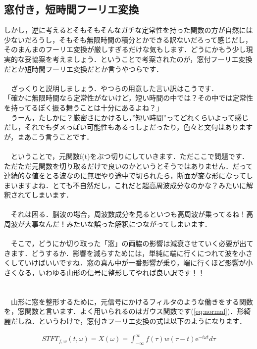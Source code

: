 \documentclass[11pt,a4paper,uplatex]{ujreport} 	%
\begin{document}
\subsection{窓付き，短時間フーリエ変換}
しかし，逆に考えるとそもそもそんなガチな定常性を持った関数の方が自然には少ないだろうし，そもそも無限時間の積分とかできる訳ないだろって感じだし，そのまんまのフーリエ変換が厳しすぎるだけな気もします．どうにかもう少し現実的な妥協案を考えましょう．ということで考案されたのが，窓付フーリエ変換だとか短時間フーリエ変換だとか言うやつらです．\\
\\
　ざっくりと説明しましょう．やつらの用意した言い訳はこうです．\\
「確かに無限時間なら定常性がないけど，短い時間の中では？その中では定常性を持ってるぽく振る舞うことは十分にあるよね？」\\
　うーん，たしかに？厳密さにかけるし，”短い時間”ってどれくらいよって感じだし，それでもダメっぽい可能性もあるっしょだったり，色々と文句はありますが，まあこう言うことです．\\
\\
　ということで，元関数f(t)をぶつ切りにしていきます．ただここで問題です．ただただ元関数を切り取るだけで良いのかというとそうではありません．だって連続的な値をとる波なのに無理やり途中で切られたら，断面が変な形になってしまいますよね．とても不自然だし，これだと超高周波成分なのかな？みたいに解釈されてしまいます．\\
\\
　それは困る．脳波の場合，周波数成分を見るといつも高周波が乗ってるね！高周波が大事なんだ！みたいな誤った解釈につながってしまいます．\\
\\
　そこで，どうにか切り取った「窓」の両脇の影響は減衰させていく必要が出てきます．どうするか．影響を減らすためには，単純に端に行くにつれて波を小さくしていけばいいですね．窓の真ん中が一番影響が乗り，端に行くほど影響が小さくなる，いわゆる山形の信号に整形してやれば良い訳です！！\\
\\
\\
　山形に窓を整形するために，元信号にかけるフィルタのような働きをする関数を，窓関数と言います．よく用いられるのはガウス関数です(\ref{eq:normal})．形綺麗だしね．というわけで，窓付きフーリエ変換の式は以下のようになります．

\begin{eqnarray}
STFT_{f,w}(t, \omega) =X(\omega)= \int_{-\infty}^{\infty} f(\tau)w(\tau - t)\mathrm{e}^{-i\omega t} d\tau
\label{eq:stft}
\end{eqnarray}
\end{document}
